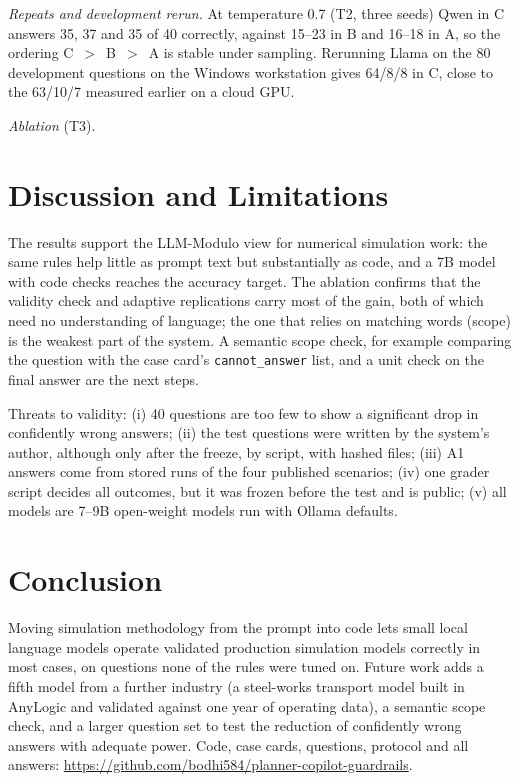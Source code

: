 \documentclass[conference]{IEEEtran}
\begin{document}
\emph{Repeats and development rerun.} At temperature 0.7 (T2, three seeds) Qwen in C answers 35, 37 and 35 of 40 correctly, against 15--23 in B and 16--18 in A, so the ordering C~$>$~B~$>$~A is stable under sampling. Rerunning Llama on the 80 development questions on the Windows workstation gives 64/8/8 in C, close to the 63/10/7 measured earlier on a cloud GPU.

\emph{Ablation} (T3). 

\section{Discussion and Limitations}
The results support the LLM-Modulo view \cite{kambhampati2024} for numerical simulation work: the same rules help little as prompt text but substantially as code, and a 7B model with code checks reaches the accuracy target. The ablation confirms that the validity check and adaptive replications carry most of the gain, both of which need no understanding of language; the one that relies on matching words (scope) is the weakest part of the system. A semantic scope check, for example comparing the question with the case card's \texttt{cannot\_answer} list, and a unit check on the final answer are the next steps.

Threats to validity: (i) 40 questions are too few to show a significant drop in confidently wrong answers; (ii) the test questions were written by the system's author, although only after the freeze, by script, with hashed files; (iii) A1 answers come from stored runs of the four published scenarios; (iv) one grader script decides all outcomes, but it was frozen before the test and is public; (v) all models are 7--9B open-weight models run with Ollama defaults.

\section{Conclusion}
Moving simulation methodology from the prompt into code lets small local language models operate validated production simulation models correctly in most cases, on questions none of the rules were tuned on. Future work adds a fifth model from a further industry (a steel-works transport model built in AnyLogic and validated against one year of operating data), a semantic scope check, and a larger question set to test the reduction of confidently wrong answers with adequate power. Code, case cards, questions, protocol and all answers: \url{https://github.com/bodhi584/planner-copilot-guardrails}.
\end{document}
